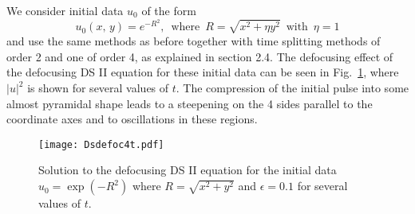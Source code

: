 \documentclass[final]{siamltex}
\begin{document}
We consider initial data $u_{0}$ of the form
\begin{equation}\label{e13}
u_{0}(x,\, y)=e^{-R^{2}},\,\,\,\mbox{where}\,\,\, R=\sqrt{x^{2}+\eta y^{2}}\,\,\,\mbox{with}\,\,\,\eta=1
\end{equation}
and use the same methods as before together with time splitting 
methods of order 2 and one of order 4, as 
explained in section 2.4. The defocusing effect of the defocusing DS 
II equation for these initial data can be seen in 
Fig.~\ref{figDSdefoc}, where $|u|^{2}$ is shown for several values 
of $t$. The compression of the initial pulse 
into some almost pyramidal shape
leads to a steepening on the 4 sides parallel to the coordinate axes 
and to oscillations in these regions.
\begin{figure}[htb!]
 \centering
 \texttt{[image: Dsdefoc4t.pdf]}
 \caption{Solution to the defocusing DS II equation for the initial 
 data $u_{0}=\exp(-R^{2})$
 where  $R=\sqrt{x^{2}+y^{2}}$  and $\epsilon=0.1$ for several values of $t$.}
    \label{figDSdefoc}
\end{figure}
\end{document}
